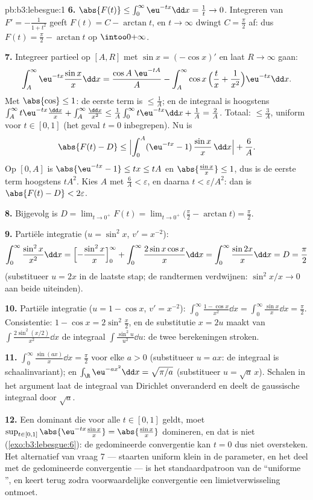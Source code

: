 \begin{solution}{pb:b3:lebesgue:1}
\textbf{6.} $\abs{F(t)} \leq \int_0^\infty\eu^{-tx}\dd x =
\frac1t \to 0$. Integreren van $F' = -\frac1{1+t^2}$ geeft $F(t) =
C - \arctan t$, en $t \to \infty$ dwingt $C = \frac\pi2$ af: dus
$F(t) = \frac\pi2 - \arctan t$ op $\intoo0{+\infty}$.

\textbf{7.} Integreer partieel op $[A, R]$ met $\sin x = (-\cos
x)'$ en laat $R \to \infty$ gaan:
\[
\int_A^{\infty}\eu^{-tx}\frac{\sin x}x\dd x
= \frac{\cos A\;\eu^{-tA}}{A}
- \int_A^\infty \cos x\,\Bigl(\frac tx +
\frac1{x^2}\Bigr)\eu^{-tx}\dd x .
\]
Met $\abs{\cos} \leq 1$: de eerste term is $\leq \frac1A$; en de
integraal is hoogstens $\int_A^\infty t\eu^{-tx}\frac{\dd x}x +
\int_A^\infty\frac{\dd x}{x^2} \leq \frac1A\int_0^\infty
t\eu^{-tx}\dd x + \frac1A = \frac2A$. Totaal: $\leq \frac 3A$,
uniform voor $t \in [0, 1]$ (het geval $t = 0$ inbegrepen). Nu is
\[
\abs{F(t) - D} \leq
\Bigl|\int_0^A(\eu^{-tx} - 1)\,\frac{\sin x}x\,\dd x\Bigr| +
\frac6A .
\]
Op $[0, A]$ is $\abs{\eu^{-tx} - 1} \leq tx \leq tA$ en
$\abs{\frac{\sin x}x} \leq 1$, dus is de eerste term hoogstens
$tA^2$. Kies $A$ met $\frac6A < \varepsilon$, en daarna $t <
\varepsilon/A^2$: dan is $\abs{F(t) - D} < 2\varepsilon$.

\textbf{8.} Bijgevolg is $D = \lim_{t\to0^+}F(t) =
\lim_{t\to0^+}\bigl(\frac\pi2 - \arctan t\bigr) = \frac\pi2$.

\textbf{9.} Partiële integratie ($u = \sin^2x$, $v' = x^{-2}$):
\[
\int_0^\infty\frac{\sin^2x}{x^2}\dd x
= \Bigl[-\frac{\sin^2x}{x}\Bigr]_0^\infty +
\int_0^\infty\frac{2\sin x\cos x}{x}\dd x
= \int_0^\infty\frac{\sin 2x}{x}\dd x = D = \frac\pi2
\]
(substitueer $u = 2x$ in de laatste stap; de randtermen
verdwijnen: $\sin^2 x/x \to 0$ aan beide uiteinden).

\textbf{10.} Partiële integratie ($u = 1 - \cos x$, $v' =
x^{-2}$): $\int_0^\infty\frac{1 - \cos x}{x^2}\dd x =
\int_0^\infty\frac{\sin x}x\dd x = \frac\pi2$. Consistentie: $1 -
\cos x = 2\sin^2\frac x2$, en de substitutie $x = 2u$ maakt van
$\int\frac{2\sin^2(x/2)}{x^2}\dd x$ de integraal
$\int\frac{\sin^2u}{u^2}\dd u$: de twee berekeningen stroken.

\textbf{11.} $\int_0^\infty\frac{\sin(ax)}x\dd x = \frac\pi2$ voor
elke $a > 0$ (substitueer $u = ax$: de integraal is
schaalinvariant); en $\int_\R\eu^{-ax^2}\dd x = \sqrt{\pi/a}$
(substitueer $u = \sqrt a\,x$). Schalen in het argument laat de
integraal van Dirichlet onveranderd en deelt de gaussische
integraal door $\sqrt a$.

\textbf{12.} Een dominant die voor alle $t \in [0,1]$ geldt, moet
$\sup_{t\in[0,1]}\abs{\eu^{-tx}\frac{\sin x}x} = \abs{\frac{\sin
x}x}$ domineren, en dat is niet 
(\cref{exo:b3:lebesgue:6}): de gedomineerde convergentie kan $t =
0$ dus niet oversteken. Het alternatief van vraag 7 --- staarten
uniform klein in de parameter, en het  deel met de
gedomineerde convergentie --- is het standaardpatroon van de
``uniforme '', en keert terug zodra
voorwaardelijke convergentie een limietverwisseling ontmoet.


\end{solution}
